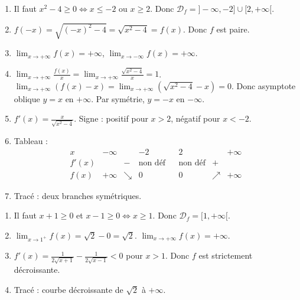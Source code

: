 \begin{enumerate}[label=\alph*)]
\item Il faut \(x^2-4\ge0\iff x\le-2\) ou \(x\ge2\). Donc \(\mathcal{D}_f=]-\infty,-2]\cup[2,+\infty[\).
\item \(f(-x)=\sqrt{(-x)^2-4}=\sqrt{x^2-4}=f(x)\). Donc \(f\) est paire.
\item \(\lim_{x\to +\infty}f(x)=+\infty\), \(\lim_{x\to -\infty}f(x)=+\infty\).
\item \(\lim_{x\to +\infty}\frac{f(x)}{x}=\lim_{x\to +\infty}\frac{\sqrt{x^2-4}}{x}=1\). \(\lim_{x\to +\infty}(f(x)-x)=\lim_{x\to +\infty}(\sqrt{x^2-4}-x)=0\). Donc asymptote oblique \(y=x\) en \(+\infty\). Par symétrie, \(y=-x\) en \(-\infty\).
\item \(f'(x)=\frac{x}{\sqrt{x^2-4}}\). Signe : positif pour \(x>2\), négatif pour \(x<-2\).
\item Tableau :
\[
\begin{array}{c|ccccccccccc}
x & -\infty & & -2 & & 2 & & +\infty \\
\hline
f'(x) & & - & \text{non déf} & & \text{non déf} & + & \\
\hline
f(x) & +\infty & \searrow & 0 & & 0 & \nearrow & +\infty
\end{array}
\]
\item Tracé : deux branches symétriques.
\end{enumerate}

\begin{enumerate}[label=\alph*)]
\item Il faut \(x+1\ge0\) et \(x-1\ge0\iff x\ge1\). Donc \(\mathcal{D}_f=[1,+\infty[\).
\item \(\lim_{x\to 1^+}f(x)=\sqrt{2}-0=\sqrt{2}\). \(\lim_{x\to +\infty}f(x)=+\infty\).
\item \(f'(x)=\frac{1}{2\sqrt{x+1}}-\frac{1}{2\sqrt{x-1}}<0\) pour \(x>1\). Donc \(f\) est strictement décroissante.
\item Tracé : courbe décroissante de \(\sqrt{2}\) à \(+\infty\).
\end{enumerate}


